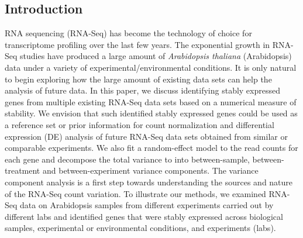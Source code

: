 
\subsection{Introduction}\label{section:Introduction}

RNA sequencing (RNA-Seq) has become the technology of choice for transcriptome
profiling over the last few years. The exponential growth in RNA-Seq studies have
produced a large amount of \textit{Arabidopsis thaliana} (Arabidopsis) data under a variety of 
experimental/environmental conditions.  It is only natural to begin exploring
how the large amount of existing data sets can help the analysis of future
data.  In this paper, we discuss identifying stably expressed genes from
multiple existing RNA-Seq data sets based on a numerical measure of stability.
We envision that such identified stably expressed genes could be used as a
reference set or prior information for count normalization and differential
expression (DE) analysis of future RNA-Seq data sets obtained from similar or
comparable experiments.  We also fit a random-effect model to the read counts
for each gene and decompose the total variance to into between-sample,
between-treatment and between-experiment variance components. The variance component
analysis is a first step towards understanding the sources and nature of the
RNA-Seq count variation.  To illustrate our methods, we examined RNA-Seq data
on \howmanySamples Arabidopsis  samples from \howmanylab different experiments carried out by
different labs and identified genes that were stably expressed across
biological samples, experimental or environmental conditions, and experiments
(labs).  


